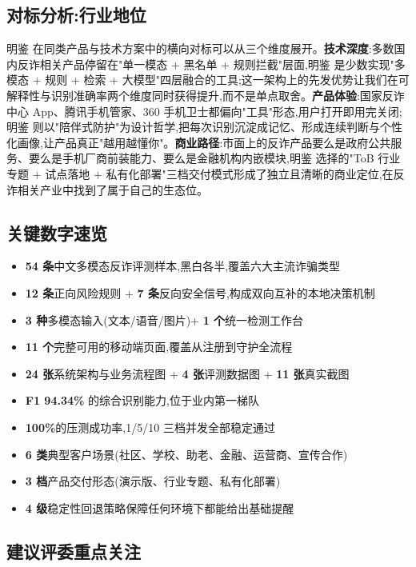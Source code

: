 \documentclass[UTF8,a4paper,12pt]{ctexart}
\begin{document}
\subsection{对标分析:行业地位}

明鉴 在同类产品与技术方案中的横向对标可以从三个维度展开。\textbf{技术深度}:多数国内反诈相关产品停留在"单一模态 + 黑名单 + 规则拦截"层面,明鉴 是少数实现"多模态 + 规则 + 检索 + 大模型"四层融合的工具;这一架构上的先发优势让我们在可解释性与识别准确率两个维度同时获得提升,而不是单点取舍。\textbf{产品体验}:国家反诈中心 App、腾讯手机管家、360 手机卫士都偏向"工具"形态,用户打开即用完关闭;明鉴 则以"陪伴式防护"为设计哲学,把每次识别沉淀成记忆、形成连续判断与个性化画像,让产品真正"越用越懂你"。\textbf{商业路径}:市面上的反诈产品要么是政府公共服务、要么是手机厂商前装能力、要么是金融机构内嵌模块,明鉴 选择的"ToB 行业专题 + 试点落地 + 私有化部署"三档交付模式形成了独立且清晰的商业定位,在反诈相关产业中找到了属于自己的生态位。

\subsection{关键数字速览}

\begin{itemize}[leftmargin=2em,itemsep=0.3em]
    \item \textbf{54 条}中文多模态反诈评测样本,黑白各半,覆盖六大主流诈骗类型
    \item \textbf{12 条}正向风险规则 + \textbf{7 条}反向安全信号,构成双向互补的本地决策机制
    \item \textbf{3 种}多模态输入(文本/语音/图片)+ \textbf{1 个}统一检测工作台
    \item \textbf{11 个}完整可用的移动端页面,覆盖从注册到守护全流程
    \item \textbf{24 张}系统架构与业务流程图 + \textbf{4 张}评测数据图 + \textbf{11 张}真实截图
    \item \textbf{F1 94.34\%} 的综合识别能力,位于业内第一梯队
    \item \textbf{100\%}的压测成功率,1/5/10 三档并发全部稳定通过
    \item \textbf{6 类}典型客户场景(社区、学校、助老、金融、运营商、宣传合作)
    \item \textbf{3 档}产品交付形态(演示版、行业专题、私有化部署)
    \item \textbf{4 级}稳定性回退策略保障任何环境下都能给出基础提醒
\end{itemize}

\subsection{建议评委重点关注}
\end{document}
